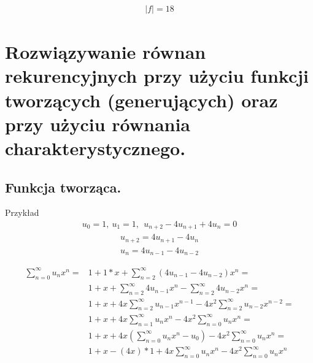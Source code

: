 \documentclass[12pt]{article}
\begin{document}
    \begin{align*}
        |f| = 18
    \end{align*}



    \newpage

    \section{Rozwiązywanie równan rekurencyjnych przy użyciu funkcji tworzących (generujących) oraz przy użyciu równania charakterystycznego.}

    \subsection{Funkcja tworząca.}

    Przykład
    \begin{align*}
       u_0 = 1, ~ u_1 = 1, ~~ u_{n+2} - 4 u_{n+1} + 4 u_n = 0
    \end{align*}
    \begin{align*}
        u_{n+2} = 4 u_{n+1} - 4 u_n
    \end{align*}
    \begin{align*}
        u_n = 4 u_{n-1} - 4 u_{n-2}
    \end{align*}

    \begin{align*}
        \sum_{n=0}^{\infty} u_n x^n = &1 + 1*x + \sum_{n=2}^{\infty} (4 u_{n-1} - 4 u_{n-2})x^n =\\
        &1 + x + \sum_{n=2}^{\infty} 4 u_{n-1} x^n - \sum_{n=2}^{\infty} 4 u_{n-2} x^n =\\
        &1 + x + 4x \sum_{n=2}^{\infty} u_{n-1} x^{n-1} - 4x^2 \sum_{n=2}^{\infty} u_{n-2} x^{n-2} =\\
        &1 + x + 4x \sum_{n=1}^{\infty} u_n x^n - 4x^2 \sum_{n=0}^{\infty} u_n x^n =\\
        &1 + x + 4x (\sum_{n=0}^{\infty} u_n x^n - u_0) - 4x^2 \sum_{n=0}^{\infty} u_n x^n =\\
        &1 + x - (4x)*1 + 4x \sum_{n=0}^{\infty} u_n x^n - 4x^2 \sum_{n=0}^{\infty} u_n x^n
    \end{align*}
\end{document}
